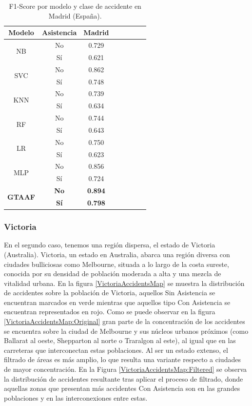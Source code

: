 \documentclass{uathesis-es}
\begin{document}
{\begin{table}[H]
\begin{center}
\begin{tabular}{|c|c||c|c|c|c|c|c|}
					\textbf{Modelo} & \textbf{Asistencia} & Madrid
					\\ \hline \hline
					
					\multirow{2}{*}{NB} &
					No &  0.729 \\ &
					Sí & 0.621 \\ \hline \hline
					\multirow{2}{*}{SVC} &
					No & 0.862 \\ &
					Sí &  0.748 \\ \hline \hline
					\multirow{2}{*}{KNN} &
					No  & 0.739 \\ &
					Sí & 0.634 \\ \hline \hline
					\multirow{2}{*}{RF} &
					No & 0.744 \\ &
					Sí & 0.643  \\ \hline \hline
					\multirow{2}{*}{LR} &
					No &  0.750 \\ &
					Sí & 0.623 \\ \hline \hline
					\multirow{2}{*}{MLP} &
					No & 0.856 \\ &
					Sí & 0.724  \\ \hline \hline
					\multirow{2}{*}{\textbf{GTAAF}} &
					\textbf{No} & \textbf{0.894} \\ &
					\textbf{Sí} & \textbf{0.798} \\ \hline \hline
				\end{tabular}
			\end{center}
			\caption{F1-Score por modelo y clase de accidente en Madrid (España).}
			\label{SpainMetrics}
		\end{table}
		
		\subsubsection*{Victoria}
		
		En el segundo caso, tenemos una región dispersa, el estado de Victoria (Australia). Victoria, un estado en Australia, abarca una región diversa con ciudades bulliciosas como Melbourne, situada a lo largo de la costa sureste, conocida por su densidad de población moderada a alta y una mezcla de vitalidad urbana. En la figura \ref{VictoriaAccidentsMap} se muestra la distribución de accidentes sobre la población de Victoria, aquellos Sin Asistencia se encuentran marcados en verde mientras que aquellos tipo Con Asistencia se encuentran representados en rojo. Como se puede observar en la figura \ref{VictoriaAccidentsMap:Original} gran parte de la concentración de los accidentes se encuentra sobre la ciudad de Melbourne y sus núcleos urbanos próximos (como Ballarat al oeste, Shepparton al norte o Traralgon al este), al igual que en las carreteras que interconectan estas poblaciones. Al ser un estado extenso, el filtrado de áreas es más amplio, lo que resulta una variante respecto a ciudades de mayor concentración. En la Figura \ref{VictoriaAccidentsMap:Filtered} se observa la distribución de accidentes resultante tras aplicar el proceso de filtrado, donde aquellas zonas que presentan más accidentes Con Asistencia son en las grandes poblaciones y en las interconexiones entre estas.
		
}
\end{document}
